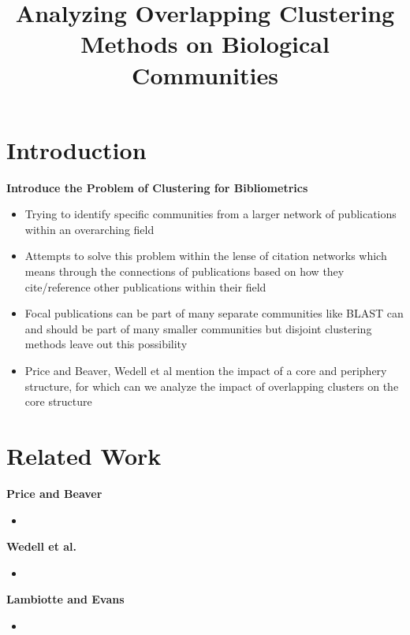 \documentclass{article}
\begin{document}
\title{Analyzing Overlapping Clustering Methods on Biological Communities }


\section{Introduction}

\textbf{ Introduce the Problem of Clustering for Bibliometrics}
\begin{itemize}
	\item Trying to identify specific communities from a larger network of publications within an overarching field
	\item Attempts to solve this problem within the lense of citation networks which means through the connections of publications based on how they cite/reference other publications within their field
	\item Focal publications can be part of many separate communities like BLAST can and should be part of many smaller communities but disjoint clustering methods leave out this possibility 
	\item Price and Beaver, Wedell et al mention the impact of a core and periphery structure, for which can we analyze the impact of overlapping clusters on the core structure
 \end{itemize}

\section{Related Work}
\textbf{Price and Beaver}
\begin{itemize}
	\item 
\end{itemize}
\textbf{Wedell et al.}
\begin{itemize}
	\item 
\end{itemize}
\textbf{Lambiotte and Evans}
\begin{itemize}
	\item 
\end{itemize}
\end{document}
